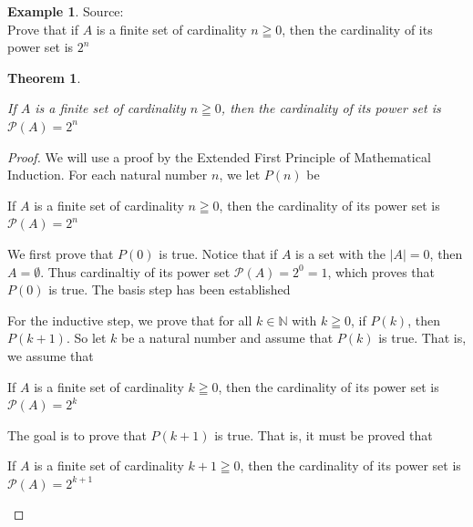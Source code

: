 \documentclass{book}
\newtheorem{theorem}{Theorem}[section]
\theoremstyle{definition}
\newtheorem{example}{Example}[definition]
\theoremstyle{remark}
\newcommand{\bb}[1]{\mathbb{#1}}
\begin{document}
\newpage
\begin{example}
Source: \cite[Chap.6, S.6.1, Result 6.15]{gray} \\ 

Prove that if $A$ is a finite set of cardinality $n \geqq 0$, then the cardinality of its power set is $2^n$
    \begin{tcolorbox}
        \begin{theorem}
                \begin{center}
                    If $A$ is a finite set of cardinality $n \geqq 0$, then the cardinality of its power set is $\mathcal P \left({A}\right) =2^n$
                \end{center}
        \end{theorem}
    \end{tcolorbox}

    \begin{proof}
        We will use a proof by the Extended First Principle of Mathematical Induction. For each natural number $n$, we let $P(n)$ be
            \begin{center}
                If $A$ is a finite set of cardinality $n \geqq 0$, then the cardinality of its power set is $\mathcal P \left({A}\right) = 2^n$
            \end{center}
        
        We first prove that $P(0)$ is true. Notice that if $A$ is a set with the $|A| = 0$, then $A = \emptyset$. Thus cardinaltiy of its power set $\mathcal P \left({A}\right) = 2^0 = 1$, which proves that $P(0)$ is true. The basis step has been established 
        
        For the inductive step, we prove that for all $k \in \bb{N}$ with $k \geqq 0$, if $P(k)$, then $P(k+1)$. So let $k$ be a natural number and assume that $P(k)$ is true. That is, we assume that 
            \begin{center}
                If $A$ is a finite set of cardinality $k \geqq 0$, then the cardinality of its power set is $\mathcal P \left({A}\right) =2^k$
            \end{center}
        
        The goal is to prove that $P(k+1)$ is true. That is, it must be proved that  
            \begin{center}
                If $A$ is a finite set of cardinality $k+1 \geqq 0$, then the cardinality of its power set is $\mathcal P \left({A}\right) =2^{k+1}$
            \end{center}
        

\end{proof}
\end{example}
\end{document}
